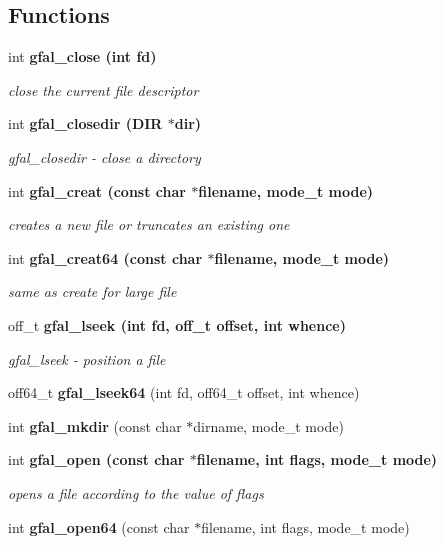 \subsection*{Functions}
\begin{CompactItemize}
\item 
int \bf{gfal\_\-close} (int fd)
\begin{CompactList}\small\item\em close the current file descriptor \item\end{CompactList}\item 
int \bf{gfal\_\-closedir} (DIR $\ast$dir)
\begin{CompactList}\small\item\em gfal\_\-closedir - close a directory \item\end{CompactList}\item 
int \bf{gfal\_\-creat} (const char $\ast$filename, mode\_\-t mode)
\begin{CompactList}\small\item\em creates a new file or truncates an existing one \item\end{CompactList}\item 
int \bf{gfal\_\-creat64} (const char $\ast$filename, mode\_\-t mode)\label{group__posix__group_g48783e60cafa1a3bf9aa2170b99f9b08}

\begin{CompactList}\small\item\em same as create for large file \item\end{CompactList}\item 
off\_\-t \bf{gfal\_\-lseek} (int fd, off\_\-t offset, int whence)
\begin{CompactList}\small\item\em gfal\_\-lseek - position a file \item\end{CompactList}\item 
off64\_\-t \textbf{gfal\_\-lseek64} (int fd, off64\_\-t offset, int whence)\label{group__posix__group_g39c7d0b6d366fdb0f218439ed3c3bb37}

\item 
int \textbf{gfal\_\-mkdir} (const char $\ast$dirname, mode\_\-t mode)\label{group__posix__group_g6f6affcf386900efc5443a9c97556a57}

\item 
int \bf{gfal\_\-open} (const char $\ast$filename, int flags, mode\_\-t mode)
\begin{CompactList}\small\item\em opens a file according to the value of flags \item\end{CompactList}\item 
int \textbf{gfal\_\-open64} (const char $\ast$filename, int flags, mode\_\-t mode)\label{group__posix__group_gbed417acea7f862ea1977417ed842ef4}


\end{CompactItemize}
